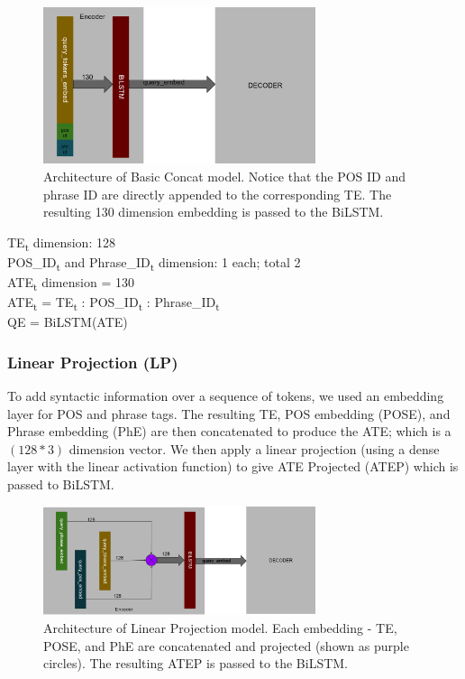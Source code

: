 \documentclass{IEEEtran}
\begin{document}
        \begin{figure}[h]
          \centering
          \includegraphics[width=8cm]{bc.png}
          \caption{Architecture of Basic Concat model. Notice that the POS ID and phrase ID
          are directly appended to the corresponding TE. The resulting 130 dimension embedding
          is passed to the BiLSTM.}
          \label{fig:bc}
        \end{figure}

        \hspace*{-3.5mm}TE\textsubscript{t} dimension: 128 \\
        POS\_ID\textsubscript{t} and Phrase\_ID\textsubscript{t} dimension: 1 each; total 2 \\
        ATE\textsubscript{t} dimension = 130 \\

        \hspace*{-3.5mm}ATE\textsubscript{t} = \lbrack TE\textsubscript{t} : 
        POS\_ID\textsubscript{t} : Phrase\_ID\textsubscript{t}\rbrack \\
        QE = BiLSTM(ATE) \\

        \subsubsection{Linear Projection (LP)}
        To add syntactic information over a sequence of tokens, we used an embedding layer for
        POS and phrase tags. The resulting TE, POS embedding (POSE), and Phrase embedding (PhE) are
        then concatenated to produce the ATE; which is a $ (128 * 3) $ dimension vector. We then
        apply a linear projection (using a dense layer with the linear activation function) to 
        give ATE Projected (ATEP) which is passed to BiLSTM. \\

        \begin{figure}[h]
          \centering
          \includegraphics[width=8cm]{lp.png}
          \caption{Architecture of Linear Projection model. Each embedding - TE, POSE, and PhE 
          are concatenated and projected (shown as purple circles). The resulting ATEP is passed
          to the BiLSTM.}
          \label{fig:lp}
        \end{figure}
\end{document}
